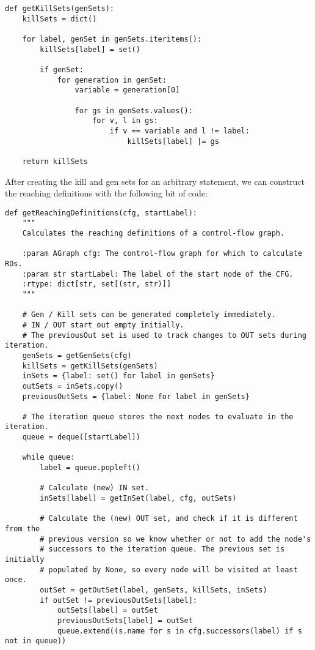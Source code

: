 \documentclass{article}
\begin{document}
{\begin{verbatim}
def getKillSets(genSets):
    killSets = dict()

    for label, genSet in genSets.iteritems():
        killSets[label] = set()

        if genSet:
            for generation in genSet:
                variable = generation[0]

                for gs in genSets.values():
                    for v, l in gs:
                        if v == variable and l != label:
                            killSets[label] |= gs

    return killSets
\end{verbatim}

After creating the kill and gen sets for an arbitrary statement, we can construct the reaching definitions with the following bit of code:

\begin{verbatim}
def getReachingDefinitions(cfg, startLabel):
    """
    Calculates the reaching definitions of a control-flow graph.

    :param AGraph cfg: The control-flow graph for which to calculate RDs.
    :param str startLabel: The label of the start node of the CFG.
    :rtype: dict[str, set[(str, str)]]
    """

    # Gen / Kill sets can be generated completely immediately.
    # IN / OUT start out empty initially.
    # The previousOut set is used to track changes to OUT sets during iteration.
    genSets = getGenSets(cfg)
    killSets = getKillSets(genSets)
    inSets = {label: set() for label in genSets}
    outSets = inSets.copy()
    previousOutSets = {label: None for label in genSets}

    # The iteration queue stores the next nodes to evaluate in the iteration.
    queue = deque([startLabel])

    while queue:
        label = queue.popleft()

        # Calculate (new) IN set.
        inSets[label] = getInSet(label, cfg, outSets)

        # Calculate the (new) OUT set, and check if it is different from the
        # previous version so we know whether or not to add the node's
        # successors to the iteration queue. The previous set is initially
        # populated by None, so every node will be visited at least once.
        outSet = getOutSet(label, genSets, killSets, inSets)
        if outSet != previousOutSets[label]:
            outSets[label] = outSet
            previousOutSets[label] = outSet
            queue.extend((s.name for s in cfg.successors(label) if s not in queue))


\end{verbatim}}
\end{document}
